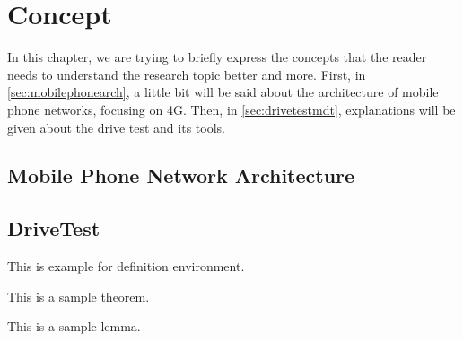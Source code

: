 \chapter{Concept}
\label{chap:Concepts}

In this chapter, we are trying to briefly express the concepts that the reader needs to understand the research topic better and more. First, in  \autoref{sec:mobilephonearch}, a little bit will be said about the architecture of mobile phone networks, focusing on 4G. Then, in  \autoref{sec:drivetestmdt}, explanations will be given about the drive test and its tools.

\section{Mobile Phone Network Architecture}
\label{sec:mobilephonearch}



\section{DriveTest}
\label{sec:drivetestmdt}
\begin{definition}
This is example for definition environment.
\end{definition}


\begin{theorem}
This is a sample theorem.
\end{theorem}

\begin{lemma}
This is a sample lemma.
\end{lemma}
